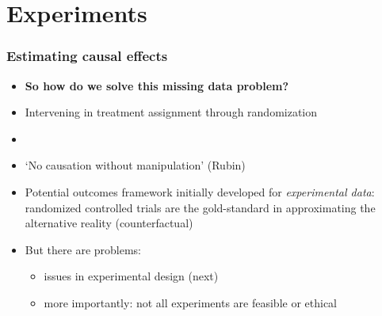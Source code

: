 \documentclass[aspectratio=43]{beamer}
\begin{document}
\section{Experiments}

\begin{frame}
\frametitle{Estimating causal effects}
\centering

\begin{itemize}
  \item \textbf{So how do we solve this missing data problem?}
  \item Intervening in treatment assignment through randomization
  \item[]
  \item `No causation without manipulation' (Rubin)
  \item Potential outcomes framework initially developed for \textit{experimental data}: randomized controlled trials are the gold-standard in approximating the alternative reality (counterfactual)
  \item But there are problems:
  \begin{itemize}
    \item issues in experimental design (next)
    \item more importantly: not all experiments are feasible or ethical
  \end{itemize}
\end{itemize}

\end{frame}

%
%
\end{document}

